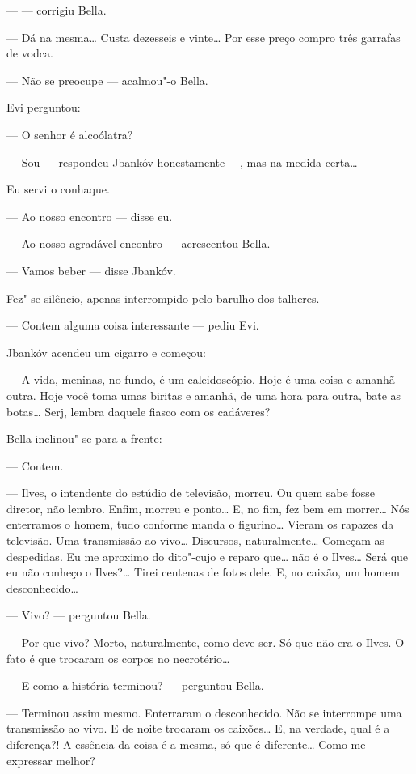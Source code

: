 ---  --- corrigiu Bella.

--- Dá na mesma\ldots{} Custa dezesseis e vinte\ldots{} Por esse preço
compro três garrafas de vodca.

--- Não se preocupe --- acalmou"-o Bella.

Evi perguntou:

--- O senhor é alcoólatra?

--- Sou --- respondeu Jbankóv honestamente ---, mas
na medida certa\ldots{}

Eu servi o conhaque.

--- Ao nosso encontro --- disse eu.

--- Ao nosso agradável encontro --- acrescentou Bella.

--- Vamos beber --- disse Jbankóv.

Fez"-se silêncio, apenas interrompido pelo barulho dos talheres.

--- Contem alguma coisa interessante --- pediu Evi.

Jbankóv acendeu um cigarro e começou:

--- A vida, meninas, no fundo, é um caleidoscópio. Hoje é uma
coisa e amanhã outra. Hoje você toma umas biritas e amanhã, de uma hora
para outra, bate as botas\ldots{} Serj, lembra daquele fiasco com os
cadáveres?

Bella inclinou"-se para a frente:

--- Contem.

--- Ilves, o intendente do estúdio de televisão, morreu. Ou quem
sabe fosse diretor, não lembro. Enfim, morreu e ponto\ldots{} E, no fim, fez
bem em morrer\ldots{} Nós enterramos o homem, tudo conforme manda o
figurino\ldots{} Vieram os rapazes da televisão. Uma transmissão ao vivo\ldots{}
Discursos, naturalmente\ldots{} Começam as despedidas. Eu me aproximo do
dito"-cujo e reparo que\ldots{} não é o Ilves\ldots{} Será que eu não conheço o
Ilves?\ldots{} Tirei centenas de fotos dele. E, no caixão, um homem
desconhecido\ldots{}

--- Vivo? --- perguntou Bella.

--- Por que vivo? Morto, naturalmente, como deve ser. Só que não
era o Ilves. O fato é que trocaram os corpos no necrotério\ldots{}

--- E como a história terminou? --- perguntou Bella.

--- Terminou assim mesmo. Enterraram o desconhecido. Não se
interrompe uma transmissão ao vivo. E de noite trocaram os caixões\ldots{} E,
na verdade, qual é a diferença?! A essência da coisa é a mesma, só que é
diferente\ldots{} Como me expressar melhor?

